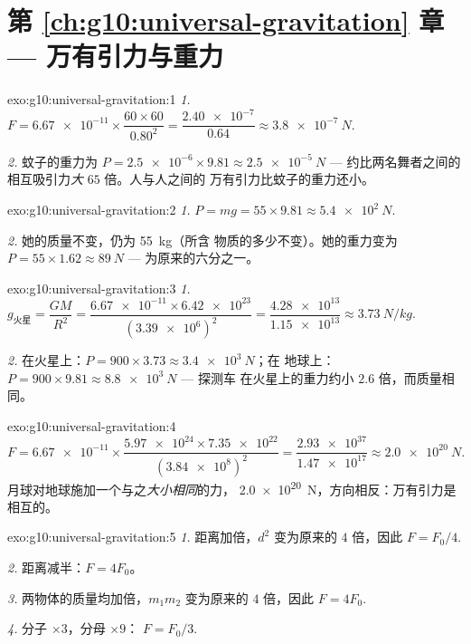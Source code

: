 \section*{第 \ref{ch:g10:universal-gravitation} 章 --- 万有引力与重力}

\begin{solution}{exo:g10:universal-gravitation:1}
\emph{1.} $F = \num{6.67e-11} \times \dfrac{60 \times 60}{0.80^2}
= \dfrac{\num{2.40e-7}}{0.64} \approx \qty{3.8e-7}{N}$.

\emph{2.} 蚊子的重力为
$P = \num{2.5e-6} \times 9.81 \approx \qty{2.5e-5}{N}$ --- 约比两名舞者之间的
相互吸引力\emph{大} $65$ 倍。人与人之间的
万有引力比蚊子的重力还小。
\end{solution}

\begin{solution}{exo:g10:universal-gravitation:2}
\emph{1.} $P = mg = 55 \times 9.81 \approx \qty{5.4e2}{N}$.

\emph{2.} 她的质量不变，仍为 \qty{55}{kg}（所含
物质的多少不变）。她的重力变为
$P = 55 \times 1.62 \approx \qty{89}{N}$ --- 为原来的六分之一。
\end{solution}

\begin{solution}{exo:g10:universal-gravitation:3}
\emph{1.} $g_{\text{火星}} = \dfrac{G M}{R^2}
= \dfrac{\num{6.67e-11} \times \num{6.42e23}}{(\num{3.39e6})^2}
= \dfrac{\num{4.28e13}}{\num{1.15e13}} \approx \qty{3.73}{N/kg}$.

\emph{2.} 在火星上：$P = 900 \times 3.73 \approx \qty{3.4e3}{N}$；在
地球上：$P = 900 \times 9.81 \approx \qty{8.8e3}{N}$ --- 探测车
在火星上的重力约小 $2.6$ 倍，而质量相同。
\end{solution}

\begin{solution}{exo:g10:universal-gravitation:4}
\[
F = \num{6.67e-11} \times
\frac{\num{5.97e24} \times \num{7.35e22}}{(\num{3.84e8})^2}
= \frac{\num{2.93e37}}{\num{1.47e17}}
\approx \qty{2.0e20}{N}.
\]
月球对地球施加一个与之\emph{大小相同}的力，
\qty{2.0e20}{N}，方向相反：万有引力是相互的。
\end{solution}

\begin{solution}{exo:g10:universal-gravitation:5}
\emph{1.} 距离加倍，$d^2$ 变为原来的 $4$ 倍，因此
$F = F_0/4$.

\emph{2.} 距离减半：$F = 4F_0$。

\emph{3.} 两物体的质量均加倍，$m_1 m_2$ 变为原来的 $4$ 倍，因此
$F = 4F_0$.

\emph{4.} 分子 $\times 3$，分母 $\times 9$：
$F = F_0/3$.
\end{solution}

